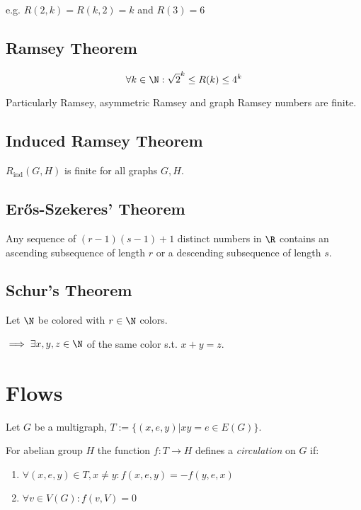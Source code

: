 \spacing

e.g. $R(2,k) = R(k,2) = k$ and $R(3) = 6$

\subsection*{Ramsey Theorem}

\vspace*{-2mm}
$$\forall k \in \N : \sqrt{2}^k \leq R(k) \leq 4^k$$

Particularly Ramsey, asymmetric Ramsey and graph Ramsey numbers are finite.

\subsection*{Induced Ramsey Theorem}

$R_\text{ind}(G,H)$ is finite for all graphs $G, H$.

\subsection*{Er\H{o}s-Szekeres' Theorem}

Any sequence of $(r-1)(s-1)+1$ distinct numbers in $\R$ contains an ascending subsequence of length $r$ or a descending subsequence of length $s$.

\subsection*{Schur's Theorem}

Let $\N$ be colored with $r \in \N$ colors.

$\implies \exists x, y, z \in \N$ of the same color s.t. $x+y=z$.

\section*{Flows}

Let $G$ be a multigraph, $T := \{(x,e,y) | xy = e \in E(G)\}$.

For abelian group $H$ the function $f : T \to H$ defines a \emph{circulation} on $G$ if:

\begin{enumerate}
	\item $\forall (x,e,y) \in T, x \neq y : f(x,e,y) = -f(y,e,x)$
	\item $\forall v \in V(G) : f(v,V) = 0$
\end{enumerate}

